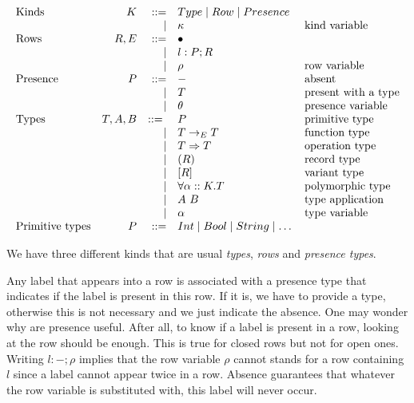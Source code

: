 \documentclass[11pt, nonacm=true, language=french, language=english]{acmart}
\begin{document}
\[
  \begin{array}{lrrll}
    \text{Kinds}           & K & ::= & Type \mid Row \mid Presence & \\
                           &&\mid & \kappa & \text{kind variable} \\

    \text{Rows}            & R, E & ::= & \bullet & \\
                           &&\mid & l:P;R & \\
                           &&\mid & \rho & \text{row variable} \\

    \text{Presence}        & P & ::= & - & \text{absent} \\
                           &&\mid & T & \text{present with a type} \\
                           &&\mid & \theta & \text{presence variable} \\

    \text{Types}           & T, A, B & ::=\ & P & \text{primitive type} \\
                           &&\mid & T \to_{E} T & \text{function type} \\
                           &&\mid & T \Rightarrow T & \text{operation type} \\
                           &&\mid & (R) & \text{record type} \\
                           &&\mid & [R] & \text{variant type} \\
                           &&\mid & \forall \alpha :: K. T & \text{polymorphic type} \\
                           &&\mid & A\ B & \text{type application} \\
                           &&\mid & \alpha & \text{type variable} \\

    \text{Primitive types} & P & ::= & Int \mid Bool \mid String \mid \dots &
  \end{array}
\]

We have three different kinds that are usual \emph{types}, \emph{rows} and \emph{presence types}.

Any label that appears into a row is associated with a presence type that indicates if the label is present in this row. If it is, we have to provide a type, otherwise this is not necessary and we just indicate the absence. One may wonder why are presence useful. After all, to know if a label is present in a row, looking at the row should be enough. This is true for closed rows but not for open ones. Writing $l:-;\rho$ implies that the row variable $\rho$ cannot stands for a row containing $l$ since a label cannot appear twice in a row. Absence guarantees that whatever the row variable is substituted with, this label will never occur.
\end{document}
